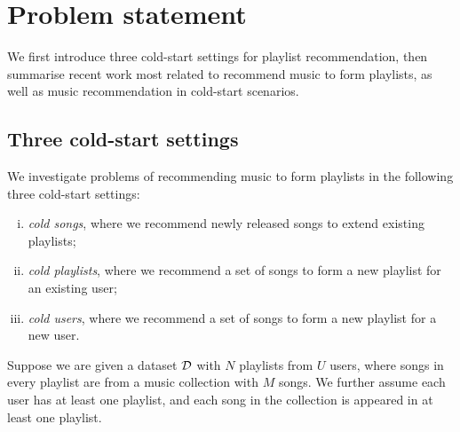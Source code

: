 \section{Problem statement}
\label{sec:problem}

We first introduce three cold-start settings for playlist recommendation, 
then summarise recent work most related to recommend music to form playlists,
as well as music recommendation in cold-start scenarios.



\subsection{Three cold-start settings}

We investigate problems of recommending music to form playlists in the following three cold-start settings:
\begin{enumerate}[(i)]
\item \emph{cold songs}, where we recommend newly released songs to extend existing playlists;
\item \emph{cold playlists}, where we recommend a set of songs to form a new playlist for an existing user;
\item \emph{cold users}, where we recommend a set of songs to form a new playlist for a new user.
\end{enumerate}


Suppose we are given a dataset $\mathcal{D}$ with $N$ playlists from $U$ users, 
where songs in every playlist are from a music collection with $M$ songs.
We further assume each user has at least one playlist, and each song in the collection 
is appeared in at least one playlist.

